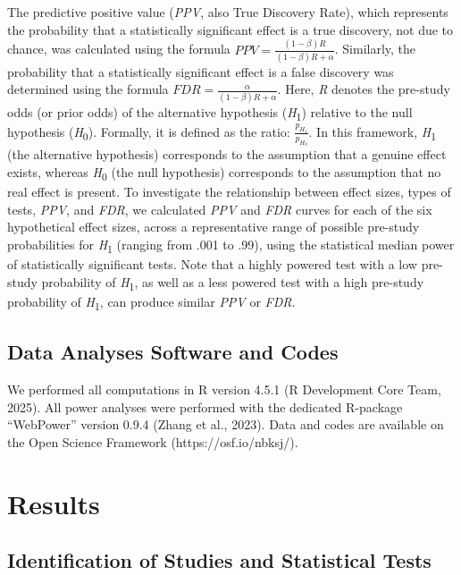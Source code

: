 \documentclass[authordate, meta]{jote-new-article}
\begin{document}
	The predictive positive value (\emph{PPV}, also True Discovery Rate), which represents the probability that a statistically significant effect is a true discovery, not due to chance, was calculated using the formula $PPV=\frac{(1-\beta)R}{(1-\beta)R+\alpha}$. Similarly, the probability that a statistically significant effect is a false discovery was determined using the formula $FDR=\frac{\alpha}{(1-\beta)R+\alpha}$. Here, \emph{R} denotes the pre-study odds (or prior odds) of the alternative hypothesis (\emph{H}\textsubscript{1}) relative to the null hypothesis (\emph{H}\textsubscript{0}). Formally, it is defined as the ratio: $\frac{p_{H_1}}{p_{H_0}}$. In this framework, \emph{H}\textsubscript{1} (the alternative hypothesis) corresponds to the assumption that a genuine effect exists, whereas \emph{H}\textsubscript{0} (the null hypothesis) corresponds to the assumption that no real effect is present. To investigate the relationship between effect sizes, types of tests, \emph{PPV}, and \emph{FDR}, we calculated \emph{PPV} and \emph{FDR} curves for each of the six hypothetical effect sizes, across a representative range of possible pre-study probabilities for \emph{H}\textsubscript{1} (ranging from .001 to .99), using the statistical median power of statistically significant tests. Note that a highly powered test with a low pre-study probability of \emph{H}\textsubscript{1}, as well as a less powered test with a high pre-study probability of \emph{H}\textsubscript{1}, can produce similar \emph{PPV} or \emph{FDR}.



	\subsection{Data Analyses Software and Codes}



	We performed all computations in R version 4.5.1 (R Development Core Team, 2025). All power analyses were performed with the dedicated R-package “WebPower” version 0.9.4 (Zhang et al., 2023). Data and codes are available on the Open Science Framework (https://osf.io/nbksj/).



	\section{Results}



	\subsection{Identification of Studies and Statistical Tests}
\end{document}
